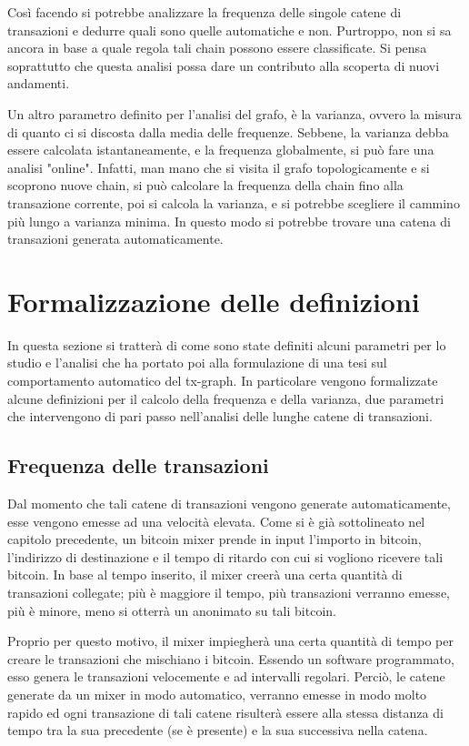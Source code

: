 Così facendo si potrebbe analizzare la frequenza delle singole catene di transazioni e dedurre quali sono quelle automatiche e non. Purtroppo, non si sa ancora in base a quale regola tali chain possono essere classificate. Si pensa soprattutto che questa analisi possa dare un contributo alla scoperta di nuovi andamenti.

Un altro parametro definito per l'analisi del grafo, è la varianza, ovvero la misura di quanto ci si discosta dalla media delle frequenze. Sebbene, la varianza debba essere calcolata istantaneamente, e la frequenza globalmente, si può fare una analisi "online". Infatti, man mano che si visita il grafo topologicamente e si scoprono nuove chain, si può calcolare la frequenza della chain fino alla transazione corrente, poi si calcola la varianza, e si potrebbe scegliere il cammino più lungo a varianza minima. In questo modo si potrebbe trovare una catena di transazioni generata automaticamente.

\section{Formalizzazione delle definizioni}

In questa sezione si tratterà di come sono state definiti alcuni parametri per lo studio e l'analisi che ha portato poi alla formulazione di una tesi sul comportamento automatico del tx-graph. In particolare vengono formalizzate alcune definizioni per il calcolo della frequenza e della varianza, due parametri che intervengono di pari passo nell'analisi delle lunghe catene di transazioni.

\subsection{Frequenza delle transazioni}

Dal momento che tali catene di transazioni vengono generate automaticamente, esse vengono emesse ad una velocità elevata. Come si è già sottolineato nel capitolo precedente, un bitcoin mixer prende in input l'importo in bitcoin, l'indirizzo di destinazione e il tempo di ritardo con cui si vogliono ricevere tali bitcoin. In base al tempo inserito, il mixer creerà una certa quantità di transazioni collegate; più è maggiore il tempo, più transazioni verranno emesse, più è minore, meno si otterrà un anonimato su tali bitcoin.

Proprio per questo motivo, il mixer impiegherà una certa quantità di tempo per creare le transazioni che mischiano i bitcoin. Essendo un software programmato, esso genera le transazioni velocemente e ad intervalli regolari. Perciò, le catene generate da un mixer in modo automatico, verranno emesse in modo molto rapido ed ogni transazione di tali catene risulterà essere alla stessa distanza di tempo tra la sua precedente (se è presente) e la sua successiva nella catena.

